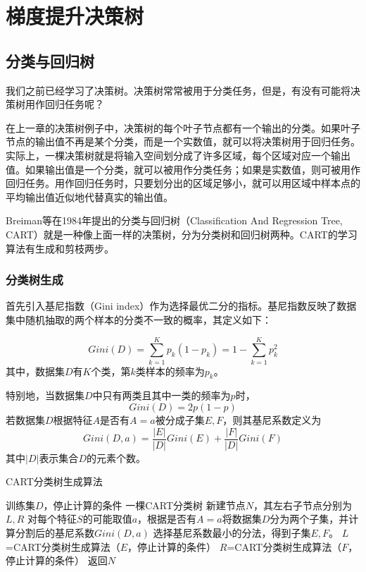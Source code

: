 \section{梯度提升决策树}
\subsection{分类与回归树}
	我们之前已经学习了决策树。决策树常常被用于分类任务，但是，有没有可能将决策树用作回归任务呢？\par
	在上一章的决策树例子中，决策树的每个叶子节点都有一个输出的分类。如果叶子节点的输出值不再是某个分类，而是一个实数值，就可以将决策树用于回归任务。实际上，一棵决策树就是将输入空间划分成了许多区域，每个区域对应一个输出值。如果输出值是一个分类，就可以被用作分类任务；如果是实数值，则可被用作回归任务。用作回归任务时，只要划分出的区域足够小，就可以用区域中样本点的平均输出值近似地代替真实的输出值。\par
	Breiman等在1984年提出的分类与回归树（Classification And Regression Tree, CART）就是一种像上面一样的决策树，分为分类树和回归树两种。CART的学习算法有生成和剪枝两步。\par
\subsubsection{分类树生成}
	首先引入基尼指数（Gini index）作为选择最优二分的指标。基尼指数反映了数据集中随机抽取的两个样本的分类不一致的概率，其定义如下：\par
\begin{equation}
	Gini(D)=\sum\limits_{k=1}^K p_k(1-p_k)=1-\sum\limits_{k=1}^K p_k^2
\end{equation}
	其中，数据集$D$有$K$个类，第$k$类样本的频率为$p_k$。\par
	特别地，当数据集$D$中只有两类且其中一类的频率为$p$时，
\begin{equation}
	Gini(D)=2p(1-p)
\end{equation}
	若数据集$D$根据特征$A$是否有$A=a$被分成子集$E, F$，则其基尼系数定义为
\begin{equation}
	Gini(D,a)=\frac{|E|}{|D|}Gini(E)+\frac{|F|}{|D|}Gini(F)
\end{equation}
	其中$|D|$表示集合$D$的元素个数。\par
\begin{algorithm}  
\caption{CART分类树生成算法}
\begin{algorithmic}[1]
\Require 训练集$D$，停止计算的条件
\Ensure 一棵CART分类树
	\State 新建节点$N$，其左右子节点分别为$L,R$
	\State 对每个特征$S$的可能取值$a$，根据是否有$A=a$将数据集$D$分为两个子集，并计算分割后的基尼系数$Gini(D,a)$
	\State 选择基尼系数最小的分法，得到子集$E,F$。
	\State $L$=CART分类树生成算法（$E$，停止计算的条件）
	\State $R$=CART分类树生成算法（$F$，停止计算的条件）
	\State 返回$N$
\end{algorithmic}  
\end{algorithm}  
